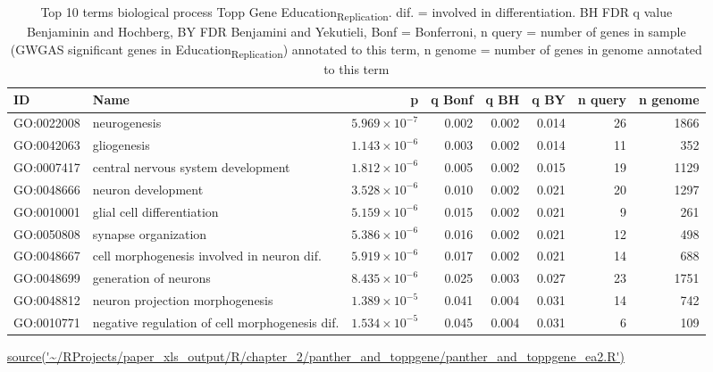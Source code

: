 \begin{table}[ht]
\centering
 \setlength{\extrarowheight}{2pt}
\begin{adjustbox}{width=\textwidth}

\begin{tabular}{llrrrrrr}
  \toprule
ID & Name & p & q Bonf & q BH & q BY & n query & n genome \\ 
  \midrule
GO:0022008 & neurogenesis & $5.969 \times 10^{-7}$ & 0.002 & 0.002 & 0.014 & 26 & 1866 \\ 
  GO:0042063 & gliogenesis & $1.143 \times 10^{-6}$ & 0.003 & 0.002 & 0.014 & 11 & 352 \\ 
  GO:0007417 & central nervous system development & $1.812 \times 10^{-6}$ & 0.005 & 0.002 & 0.015 & 19 & 1129 \\ 
  GO:0048666 & neuron development & $3.528 \times 10^{-6}$ & 0.010 & 0.002 & 0.021 & 20 & 1297 \\ 
  GO:0010001 & glial cell differentiation & $5.159 \times 10^{-6}$ & 0.015 & 0.002 & 0.021 & 9 & 261 \\ 
  GO:0050808 & synapse organization & $5.386 \times 10^{-6}$ & 0.016 & 0.002 & 0.021 & 12 & 498 \\ 
  GO:0048667 & cell morphogenesis involved in neuron dif. & $5.919 \times 10^{-6}$ & 0.017 & 0.002 & 0.021 & 14 & 688 \\ 
  GO:0048699 & generation of neurons & $8.435 \times 10^{-6}$ & 0.025 & 0.003 & 0.027 & 23 & 1751 \\ 
  GO:0048812 & neuron projection morphogenesis & $1.389 \times 10^{-5}$ & 0.041 & 0.004 & 0.031 & 14 & 742 \\ 
  GO:0010771 & negative regulation of cell morphogenesis  dif. & $1.534 \times 10^{-5}$ & 0.045 & 0.004 & 0.031 & 6 & 109 \\ 
   \bottomrule
\end{tabular}
\end{adjustbox}
\caption{Top 10 terms biological process Topp Gene Education\textsubscript{Replication}. dif. = involved in differentiation. BH FDR q value Benjaminin and Hochberg, BY FDR Benjamini and Yekutieli, Bonf = Bonferroni, n query = number of genes in sample (GWGAS significant genes in Education\textsubscript{Replication}) annotated to this term, n genome = number of genes in genome annotated to this term}
\tiny\url{source('~/RProjects/paper_xls_output/R/chapter_2/panther_and_toppgene/panther_and_toppgene_ea2.R')}
\label{tab:BP EA2 all significant toppgene top}
\end{table}




